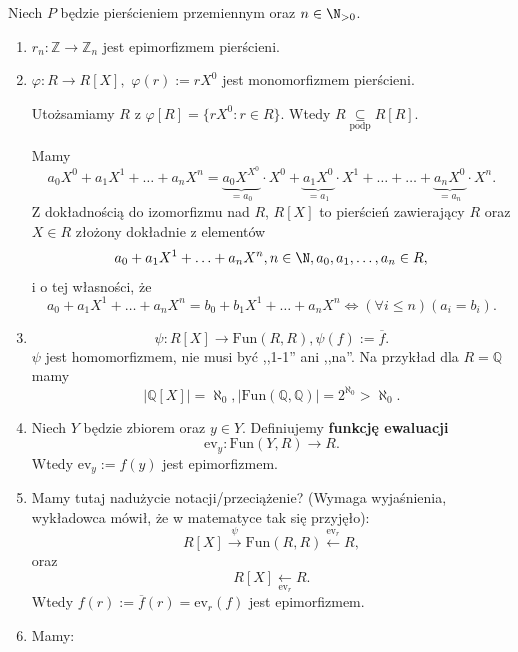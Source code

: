 Niech $P$ będzie pierścieniem przemiennym oraz $n\in \N_{>0}$.
\begin{enumerate}[label=\arabic*)]
	\item $r_{n}: \mathbb{Z} \to \mathbb{Z} _{n} $ jest epimorfizmem pierścieni.
	\item $\varphi : R \to R\left[ X \right],$ $\varphi \left( r \right) := rX^{0} $ jest monomorfizmem pierścieni.
	
		Utożsamiamy $R$ z $\varphi \left[ R \right] =\{rX^{0}: r\in R\}  $. Wtedy $R \underset{\scriptscriptstyle\text{podp}}{\subseteq} R\left[ R \right] $.

		\begin{remark}
			Mamy
			\[
			a_0X^{0}+ a_1X^{1}+\ldots + a_{n} X^{n} = \underbrace{a_0X^{X^{0}}}_{=a_0}\cdot X^{0}+ \underbrace{a_1X^{0}}_{=a_1}\cdot X^{1}+ \ldots + \ldots + \underbrace{a_{n} X^{0}}_{=a_{n} }\cdot X^{n}
			.\] 
			Z dokładnością do izomorfizmu nad $R$, $R\left[ X \right] $ to pierścień zawierający $R$ oraz $X\in R$ złożony dokładnie z elementów \[
			a_0 + a_1X^{1} + \ldots + a_{n}X^{n}, n\in \N, a_0,a_1,\ldots,a_{n} \in R
			,\] 
			i o tej własności, że
			\[
			a_0 + a_1X^{1} + \ldots + a_{n} X^{n} = b_0 + b_1X^{1} + \ldots + a_{n} X^{n} \iff \left(\forall i\le n \right)\left( a_{i}= b_{i} \right)  
			.\] 
		\end{remark}
	\item \[
	 	\psi : R\left[ X \right] \to \text{Fun}\left( R,R \right), \psi \left( f \right) := \overline{f}
	.\] 
	$\psi $ jest homomorfizmem, nie musi być ,,1-1'' ani ,,na''.
	Na przykład dla $R = \mathbb{Q} $ mamy 
	\[
	\left| \mathbb{Q} \left[ X \right]  \right| = \aleph_{0}, \left| \text{Fun}\left( \mathbb{Q} ,\mathbb{Q}  \right)  \right|= 2^{\aleph_{0}}> \aleph_{0}
	.\] 
\item Niech $Y$ będzie zbiorem oraz $y \in Y$. Definiujemy \textbf{funkcję ewaluacji} 
	\[
	\text{ev}_{y}: \text{Fun}\left( Y, R \right) \to R
	.\] 
	Wtedy $\text{ev}_{y} := f\left( y \right) $ jest epimorfizmem.
\item Mamy tutaj nadużycie notacji/przeciążenie? (Wymaga wyjaśnienia, wykładowca mówił, że w matematyce tak się przyjęło):
	\[
	R\left[ X \right] \overset{\psi }{\longrightarrow} \text{Fun}\left( R,R \right) \overset{\text{ev}_{r}}{\leftarrow }R
	,\] 
	oraz
	\[
		R\left[ X \right] \underset{\text{ev}_{r}}{\leftarrow } R
	.\] 
	Wtedy $f\left( r \right) := \overline{f}\left( r \right) = \text{ev}_{r}\left( f \right) $ jest epimorfizmem. 
\item Mamy:


\end{enumerate}
